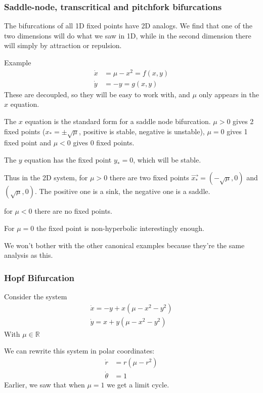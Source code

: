 \documentclass{/home/janmebows/Documents/LatexTemplates/myassignment}
\begin{document}
\subsubsection{Saddle-node, transcritical and pitchfork bifurcations}
The bifurcations of all 1D fixed points have 2D analogs. We find that one of the two dimensions will do what we saw in 1D, while in the second dimension there will simply by attraction or repulsion.

Example
\begin{align*}
    \dot x &= \mu - x^2 = f(x,y)\\
    \dot y &= - y = g(x,y)
\end{align*}
These are decoupled, so they will be easy to work with, and $\mu$ only appears in the $x$ equation.

The $x$ equation is the standard form for a saddle node bifurcation. $\mu > 0$ gives 2 fixed points ($x_*=\pm\sqrt{\mu}$, positive is stable, negative is unstable), $\mu = 0$ gives 1 fixed point and $\mu <0$ gives 0 fixed points.

The $y$ equation has the fixed point $y_*=0$, which will be stable.

Thus in the 2D system, for $\mu>0$ there are two fixed points $\vec{x_*} = \left(-\sqrt{\mu},0\right)$ and $\left(\sqrt{\mu},0\right)$. The positive one is a sink, the negative one is a saddle.

for $\mu <0$ there are no fixed points.

For $\mu=0$ the fixed point is non-hyperbolic interestingly enough.


We won't bother with the other canonical examples because they're the same analysis as this.


\subsubsection{Hopf Bifurcation}
Consider the system
\begin{align*}
    \dot x = -y + x(\mu - x^2 - y^2)\\
    \dot y = x + y(\mu-x^2-y^2)
\end{align*}
With $\mu \in \mathbb{R}$

We can rewrite this system in polar coordinates:
\begin{align*}
    \dot r &= r(\mu - r^2)\\
    \dot\theta &= 1
\end{align*}
Earlier, we saw that when $\mu=1$ we get a limit cycle. 
\end{document}

